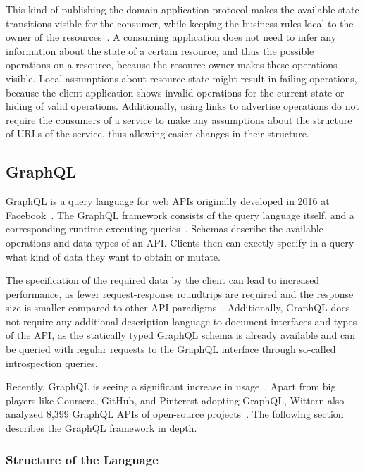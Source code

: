 This kind of publishing the domain application protocol makes the available state transitions visible for the consumer, while keeping the business rules local to the owner of the resources~\cite{Webber2010}.
A consuming application does not need to infer any information about the state of a certain resource, and thus the possible operations on a resource, because the resource owner makes these operations visible.
Local assumptions about resource state might result in failing operations, because the client application shows invalid operations for the current state or hiding of valid operations.
Additionally, using links to advertise operations do not require the consumers of a service to make any assumptions about the structure of \acp{URL} of the service, thus allowing easier changes in their structure.

\subsection{GraphQL}

GraphQL is a query language for web \acp{API} originally developed in 2016 at Facebook~\cite{Hartig2017}.
The GraphQL framework consists of the query language itself, and a corresponding runtime executing queries~\cite{Wittern2019}.
Schemas describe the available operations and data types of an \ac{API}.
Clients then can exectly specify in a query what kind of data they want to obtain or mutate.

The specification of the required data by the client can lead to increased performance, as fewer request-response roundtrips are required and the response size is smaller compared to other \ac{API} paradigms~\cite{Wittern2019}.
Additionally, GraphQL does not require any additional description language to document interfaces and types of the \ac{API}, as the statically typed GraphQL schema is already available and can be queried with regular requests to the GraphQL interface through so-called introspection queries.

Recently, GraphQL is seeing a significant increase in usage~\cite{Hartig2017}.
Apart from big players like Coursera, GitHub, and Pinterest adopting GraphQL, Wittern also analyzed 8,399 GraphQL \acp{API} of open-source projects~\cite{Wittern2019}.
The following section describes the GraphQL framework in depth.

\subsubsection{Structure of the Language}

